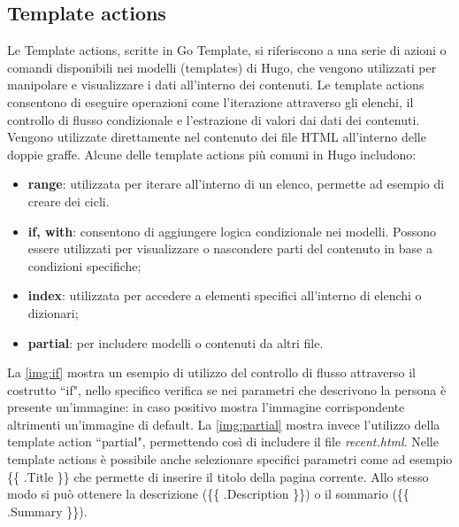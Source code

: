 \documentclass[target=bach,aauheader=]{thud}
\begin{document}
\subsection{Template actions}\label{sec:tactions}
Le Template actions, scritte in Go Template, si riferiscono a una serie di azioni o comandi disponibili nei modelli (templates) di Hugo, che vengono utilizzati per manipolare e visualizzare i dati all'interno dei contenuti. 
Le template actions consentono di eseguire operazioni come l'iterazione attraverso gli elenchi, il controllo di flusso condizionale e l'estrazione di valori dai dati dei contenuti. Vengono utilizzate direttamente nel contenuto dei file HTML all'interno delle doppie graffe. \newline
Alcune delle template actions più comuni in Hugo includono:
\begin{itemize}
    \item \textbf{range}: utilizzata per iterare all'interno di un elenco, permette ad esempio di creare dei cicli.
    \item \textbf{if, with}: consentono di aggiungere logica condizionale nei modelli. Possono essere utilizzati per visualizzare o nascondere parti del contenuto in base a condizioni specifiche;
    \item \textbf{index}: utilizzata per accedere a elementi specifici all'interno di elenchi o dizionari;
    \item \textbf{partial}: per includere modelli o contenuti da altri file. 
\end{itemize}

La \cref{img:if} mostra un esempio di utilizzo del controllo di flusso attraverso il costrutto ``if", nello specifico verifica se nei parametri che descrivono la persona è presente un'immagine: in caso positivo mostra l'immagine corrispondente altrimenti un'immagine di default.
La \cref{img:partial} mostra invece l'utilizzo della template action ``partial", permettendo così di includere il file \textit{recent.html}. \newline 
Nelle template actions è possibile anche selezionare specifici parametri come ad esempio \{\{ .Title \}\} che permette di inserire il titolo della pagina corrente. Allo stesso modo si può ottenere la descrizione (\{\{ .Description \}\}) o il sommario (\{\{ .Summary \}\}).
\end{document}
